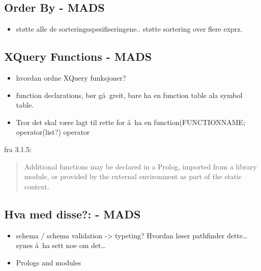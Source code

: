 \subsection{Order By - {MADS}}
\label{sect:disc:orderby}
\begin{itemize}
  \item st\o tte alle de sorteringsspesifiseringene.. st\o tte sortering over flere exprz.
\end{itemize}
	
		
\subsection{XQuery Functions - {MADS}}
\label{sect:disc:functions}
\begin{itemize}
  \item hvordan ordne XQuery funksjoner?
  \item function declarations, b\o r g\aa~greit, bare ha en function table ala symbol table.
  \item Tror det skal v\ae re lagt til rette for \aa~ha en \textsf{function(FUNCTIONNAME; operator(list?)} operator
  \end{itemize}
  
fra 3.1.5:
\begin{quote}
  Additional functions may be declared in a Prolog, imported from a library module, or provided by the external
  environment as part of the static context.
  \end{quote}


\subsection{Hva med disse?: - {MADS}}

  	\begin{itemize}
  		\item schema / schema validation -> typeting? Hvordan l\o ser pathfinder dette\ldots synes \aa~ha sett noe om
  		det\ldots
  		\item Prologs and modules
  		\end{itemize}


